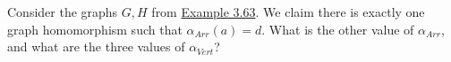 Consider the graphs $G,H$ from \hyperref[X3.63]{Example 3.63}. We claim there is exactly one graph homomorphism such that $\alpha_{Arr}(a)=d$. What is the other value of $\alpha_{Arr}$, and what are the three values of $\alpha_{Vert}$?